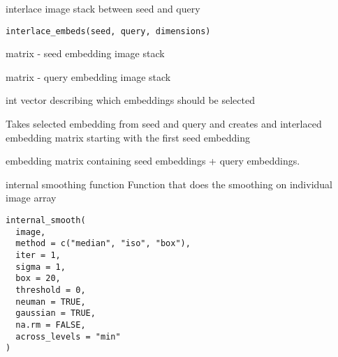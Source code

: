 \documentclass[a4paper]{book}
\begin{document}
%
\begin{Description}
interlace image stack between seed and query
\end{Description}
%
\begin{Usage}
\begin{verbatim}
interlace_embeds(seed, query, dimensions)
\end{verbatim}
\end{Usage}
%
\begin{Arguments}
\begin{ldescription}
\item[\code{seed}] matrix - seed embedding image stack

\item[\code{query}] matrix - query embedding image stack

\item[\code{dimensions}] int vector describing which embeddings
should be selected
\end{ldescription}
\end{Arguments}
%
\begin{Details}
Takes selected embedding from seed and query and 
creates and interlaced embedding matrix starting with the 
first seed embedding
\end{Details}
%
\begin{Value}
embedding matrix containing seed embeddings + query 
embeddings.
\end{Value}
%
\begin{Description}
internal smoothing function
Function that does the smoothing on individual image array
\end{Description}
%
\begin{Usage}
\begin{verbatim}
internal_smooth(
  image,
  method = c("median", "iso", "box"),
  iter = 1,
  sigma = 1,
  box = 20,
  threshold = 0,
  neuman = TRUE,
  gaussian = TRUE,
  na.rm = FALSE,
  across_levels = "min"
)
\end{verbatim}
\end{Usage}
%
\end{document}
